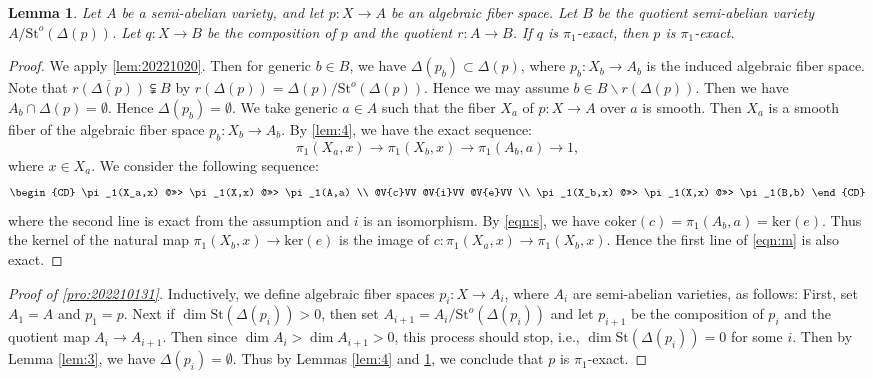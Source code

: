 \documentclass[11pt,english]{smfart}
\theoremstyle{plain}
\newtheorem{lem}[thm]{Lemma}
\theoremstyle{definition}
\theoremstyle{remark}
\numberwithin{equation}{subsection}
\theoremstyle{plain}
\begin{document}
\begin{lem}\label{lem:5}
Let $A$ be a semi-abelian variety, and let $p:X\to A$ be an algebraic fiber space. Let $B$ be the quotient semi-abelian variety $A/\mathrm{St}^o(\Delta (p))$.
Let $q:X\to B$ be the composition of $p$ and the quotient $r:A\to B$. 
If $q$ is $\pi _1$-exact, then $p$ is $\pi _1$-exact.
\end{lem}

\begin{proof}
We apply \cref{lem:20221020}.
Then for generic $b\in B$, we have $\Delta(p_b)\subset \Delta(p)$, where $p_b:X_b\to A_b$ is the induced algebraic fiber space.
Note that $\overline{r(\Delta (p))}\subsetneqq B$ by $r(\Delta (p))=\Delta(p)/\mathrm{St}^o(\Delta (p))$.
Hence we may assume $b\in B\backslash r(\Delta (p))$.
Then we have $A_b\cap \Delta(p)=\emptyset$.
Hence $\Delta(p_b)=\emptyset$.
We take generic $a\in A$ such that the fiber $X_a$ of $p:X\to A$ over $a$ is smooth.
Then $X_a$ is a smooth fiber of the algebraic fiber space $p_b:X_b\to A_b$.
By \cref{lem:4}, we have the exact sequence:
\begin{equation}\label{eqn:s}
\pi _1(X_a,x)\to \pi _1(X_b,x)\to \pi _1(A_b,a)\to 1,
\end{equation}
where $x\in X_a$.
We consider the following sequence:
\begin{equation}\label{eqn:m}
\begin{CD}
\pi _1(X_a,x) @>>> \pi _1(X,x) @>>> \pi _1(A,a) \\
@V{c}VV @V{i}VV @V{e}VV \\
\pi _1(X_b,x) @>>> \pi _1(X,x) @>>> \pi _1(B,b) 
\end{CD}
\end{equation}
where the second line is exact from the assumption and $i$ is an isomorphism.
By \eqref{eqn:s}, we have $\text{coker}(c)=\pi _1(A_b,a)=\text{ker}(e)$.
Thus the kernel of the natural map $\pi _1(X_b,x)\to \text{ker}(e)$ is the image of $c:\pi _1(X_a,x)\to \pi _1(X_b,x)$.
Hence the first line of \eqref{eqn:m} is also exact.
\end{proof}










\begin{proof}[Proof of \cref{pro:202210131}]
Inductively, we define algebraic fiber spaces $p_i:X\to A_i$, where $A_i$ are semi-abelian varieties, as follows: First, set $A_1=A$ and $p_1=p$. Next if $\dim \mathrm{St}(\Delta (p_i))>0$, then set $A_{i+1}=A_i/\mathrm{St}^o(\Delta (p_i))$ and let $p_{i+1}$ be the composition of $p_i$ and the quotient map $A_i\to A_{i+1}$. Then since $\dim A_i>\dim A_{i+1}>0$, this process should stop, i.e., $\dim \mathrm{St}(\Delta (p_i))=0$ for some $i$. Then by Lemma \ref{lem:3}, we have $\Delta (p_i)=\emptyset$. Thus by Lemmas \ref{lem:4} and \ref{lem:5}, we conclude that $p$ is $\pi _1$-exact.
\end{proof}
\end{document}
